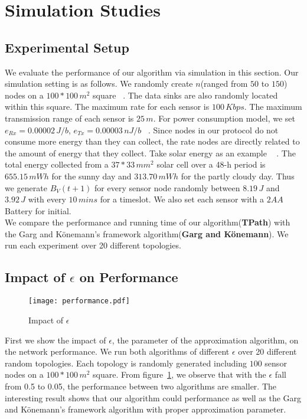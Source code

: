 \documentclass{article}
\begin{document}
\section{Simulation Studies}
\subsection{Experimental Setup}
We evaluate the performance of our algorithm via simulation in this section.
Our simulation setting is as follows. We randomly create $n$(ranged from $50$ to $150$) nodes
on a $100*100\,m^2$ square ~\cite{Maxi}. The data sinks are also randomly located within this square. The maximum rate for each sensor is $100\,Kbps$. The maximum transmission range of each sensor is $25\,m$. For power consumption model, we set $e_{Rx} = 0.00002\,J/b$, $e_{Tx} = 0.00003\,nJ/b$ ~\cite{Wire}. Since nodes in our protocol do not 
consume more energy than they can collect, the rate nodes are directly related to the amount of energy that they collect. Take solar energy as an example ~\cite{Ste} . The total energy collected from a $37 * 33\,mm^2$ solar cell over a 48-h period is $655.15\,mWh$ for the sunny day and $313.70\,mWh$ for the partly cloudy day. Thus we generate $B_V(t+1)$ for every sensor node randomly between $8.19\,J$ and $3.92\,J$ with every $10\,mins$ for a timeslot. We also set each sensor with a $2AA$ Battery for initial.\\
We compare the performance and running time of our algorithm(\textbf{TPath}) with the Garg and K\"{o}nemann's framework algorithm(\textbf{Garg and K\"{o}nemann}). We run each experiment over 20 different topologies.

\subsection{Impact of $\epsilon$ on Performance}

\begin{figure}[H]
\centering
\texttt{[image: performance.pdf]} 
\caption{Impact of $\epsilon$}
\label{f1}
\end{figure}

First we show the impact of $\epsilon$, the parameter of the approximation algorithm, on the network performance. We run both algorithms of different $\epsilon$ over 20 different random topologies. Each topology is randomly generated including $100$ sensor nodes on a $100*100\,m^2$ square. From figure~\ref{f1}, we observe that with the $\epsilon$ fall from 0.5 to 0.05, the performance between two algorithms are smaller. The interesting result shows that our algorithm could performance as well as the Garg and K\"{o}nemann's framework algorithm with proper approximation parameter.
\end{document}
